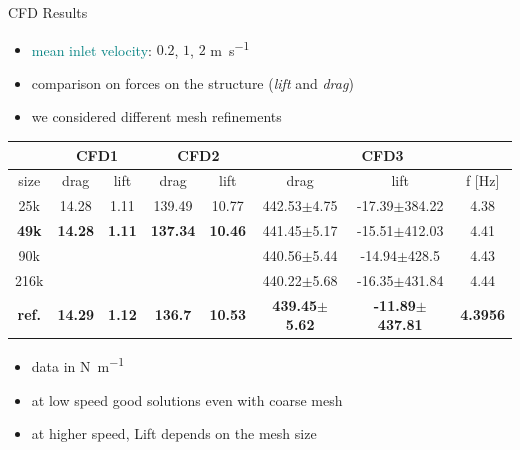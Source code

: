 \documentclass[10pt,t]{beamer}
\begin{document}
\begin{frame}{CFD Results}

\begin{itemize}
    \item \textcolor{teal}{mean inlet velocity}: $0.2$, $1$, $2$ \si{m.s^{-1}}
    \item comparison on \textcolor{dblue}{forces} on the structure (\textit{lift} and \textit{drag})
    \item we considered different mesh refinements
\end{itemize}
    
\pause

\vspace{0.2cm}

\begin{table}[h!]
\footnotesize
\label{tab:cfd}
\begin{center}
\begin{tabular}{ c | c c | c c | c c c }
 & \multicolumn{2}{c|}{CFD1} & \multicolumn{2}{c|}{CFD2} & \multicolumn{3}{c}{CFD3} \\
\hline
size & drag & lift  & drag & lift & drag & lift  & f  [\si{Hz}]\\
\hline
25k    & \cellcolor{green!10}14.28 & \cellcolor{green!10}1.11 & 139.49 & 10.77 & 442.53$\pm$4.75 & -17.39$\pm$384.22 & 4.38  \\
\hline
\textbf{49k}    & \cellcolor{green!10}\textbf{14.28}   & \cellcolor{green!10}\textbf{1.11} &
\cellcolor{green!10}\textbf{137.34} & \cellcolor{green!10}\textbf{10.46} &
\cellcolor{green!10}441.45$\pm$5.17 &\cellcolor{green!10} -15.51$\pm$412.03 &\cellcolor{green!10} 4.41 \\
\hline
90k   &         &      &        &       & \cellcolor{green!10} 440.56$\pm$5.44 &\cellcolor{green!10} -14.94$\pm$428.5  &\cellcolor{green!10} 4.43\\ 
\hline
216k    &         &      &        &       & 440.22$\pm$5.68 & -16.35$\pm$431.84 & 4.44 \\
\hline
\hline
\textbf{ref.}  &  \textbf{14.29} & \textbf{1.12} & \textbf{136.7} & \textbf{10.53} & \textbf{439.45}$\pm$\textbf{5.62} & \textbf{-11.89}$\pm$\textbf{437.81} & \textbf{4.3956} \\
\hline
\end{tabular}
\end{center}
\end{table}

\vspace{0.2cm}

\begin{itemize}
    \item data in \si{N.m^{-1}}
    \item at low speed good solutions even with coarse mesh
    \item at higher speed, Lift depends on the mesh size
\end{itemize}


\end{frame}
\end{document}
